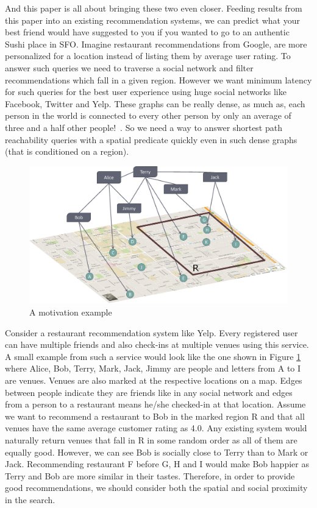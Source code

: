 And this paper is all about bringing these two even closer. Feeding results from this paper into an existing recommendation systems, we can predict what your best friend would have suggested to you if you wanted to go to an authentic Sushi place in SFO. Imagine restaurant recommendations from Google, are more personalized for a location instead of listing them by average user rating. To answer such queries we need to traverse a social network and filter recommendations which fall in a given region. However we want minimum latency for such queries for the best user experience using huge social networks like Facebook, Twitter and Yelp. These graphs can be really dense, as much as, each person in the world is connected to every other person by only an average of three and a half other people!~\cite{Taa}. So we need a way to answer shortest path reachability queries with a spatial predicate quickly even in such dense graphs (that is conditioned on a region).

\begin{figure}[t]
	\centering
	\includegraphics[width=0.88\linewidth]{images/a_motivation_example.eps}
	\caption{A motivation example}
	\label{fig:begin-example}
\end{figure}

Consider a restaurant recommendation system like Yelp. Every registered user can have multiple friends and also check-ins at multiple venues using this service. A small example from such a service would look like the one shown in Figure \ref{fig:begin-example} where Alice, Bob, Terry, Mark, Jack, Jimmy are people and letters from A to I are venues. Venues are also marked at the respective locations on a map. Edges between people indicate they are friends like in any social network and edges from a person to a restaurant means he/she checked-in at that location. Assume we want to recommend a restaurant to Bob in the marked region R and that all venues have the same average customer rating as 4.0. Any existing system would naturally return venues that fall in R in some random order as all of them are equally good. However, we can see Bob is socially close to Terry than to Mark or Jack. Recommending restaurant F before G, H and I would make Bob happier as Terry and Bob are more similar in their tastes. Therefore, in order to provide good recommendations, we should consider both the spatial and social proximity in the search.

